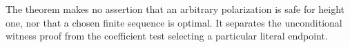 The theorem makes no assertion that an arbitrary polarization is safe for
height one, nor that a chosen finite sequence is optimal. It separates the
unconditional witness proof from the coefficient test selecting a particular
literal endpoint.




